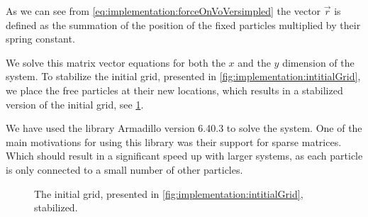 	As we can see from \cref{eq:implementation:forceOnVoVersimpled} the vector $\vec{r}$ is defined as the summation of the position of the fixed particles multiplied by their spring constant. 

	We solve this matrix vector equations for both the $x$ and the $y$ dimension of the system. To stabilize the initial grid, presented in \cref{fig:implementation:intitialGrid}, we place the free particles at their new locations, which results in a stabilized version of the initial grid, see \cref{fig:implementation:stabilizedInitial}.

	We have used the library Armadillo version 6.40.3 \cite{sanderson2010armadillo} to solve the system. One of the main motivations for using this library was their support for sparse matrices. Which should result in a significant speed up with larger systems, as each particle is only connected to a small number of other particles. 

	\begin{figure}
		\centering
		\resizebox{0.9\columnwidth}{!}{%
			\stabilizedInitialGrid
		}
		\caption{The initial grid, presented in \cref{fig:implementation:intitialGrid}, stabilized.}
		\label{fig:implementation:stabilizedInitial}
	\end{figure}


